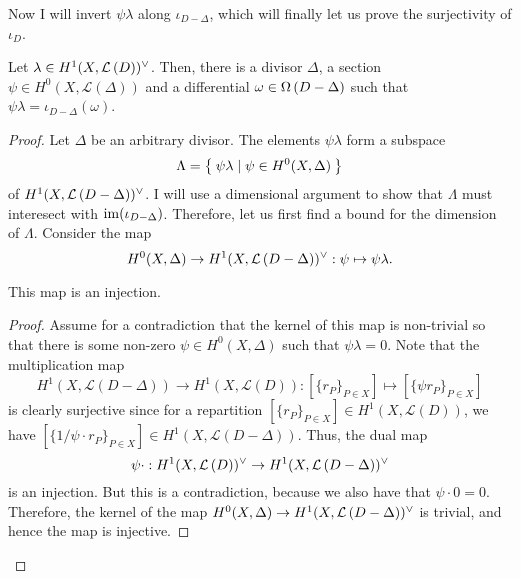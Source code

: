 Now I will invert $\psi\lambda$ along $\iota_{D-\Delta}$, which will finally
let us prove the surjectivity of $\iota_{D}$.
\begin{lemm}\label{lemm:invert_iota}
  Let $\lambda\in H^1(X,\mathcal{L}\left(D\right))^{\vee}$. Then, there is a divisor $\Delta$,
  a section $\psi\in H^{0}(X,\mathcal{L}(\Delta))$ and a differential
  $\omega\in\Omega\left(D-\Delta\right)$ such that $\psi\lambda
  =\iota_{D-\Delta}(\omega)$.
\end{lemm}
\begin{proof}
  Let $\Delta$ be an arbitrary divisor. The elements $\psi\lambda$ form a
  subspace
  \[
    \Lambda=\Set{\psi\lambda\mid\psi\in H^{0}(X,\Delta)}
  \]
  of $H^1(X,\mathcal{L}\left(D-\Delta\right))^{\vee}$. I will use a dimensional argument to show that
  $\Lambda$ must interesect with $\operatorname{im}(\iota_{D-\Delta})$. Therefore,
  let us first find a bound for the dimension of $\Lambda$. Consider the map
  \[H^{0}(X,\Delta)\to H^1(X,\mathcal{L}\left(D-\Delta\right))^{\vee}:\psi\mapsto\psi\lambda.\]
  \begin{claim}
    This map is an injection.
  \end{claim}
  {\renewcommand{\qedsymbol}{$\blacksquare$}
    \begin{proof}
      Assume for a contradiction that the kernel of this map is non-trivial
      so that there is some non-zero $\psi\in H^{0}(X,\Delta)$ such that
      $\psi\lambda=0$. Note that the multiplication map
      \[
        H^{1}(X,\mathcal{L}(D-\Delta))\to H^{1}(X,\mathcal{L}(D))
        :[\{r_{P}\}_{P\in X}]\mapsto [\{\psi r_{P}\}_{P\in X}]
      \]
      is clearly surjective since for a repartition
      $[\{r_{P}\}_{P\in X}]\in H^{1}(X,\mathcal{L}(D))$, we have
      $[\{1/\psi\cdot r_{P}\}_{P\in X}]\in H^{1}(X,\mathcal{L}(D-\Delta))$.
      Thus, the dual map
      \[\psi\cdot:H^1(X,\mathcal{L}\left(D\right))^{\vee}\to H^1(X,\mathcal{L}\left(D-\Delta\right))^{\vee}\]
      is an injection. But this is a contradiction, because we also have that
      $\psi\cdot 0=0$. Therefore, the kernel of the map
      $H^{0}(X,\Delta)\to H^1(X,\mathcal{L}\left(D-\Delta\right))^{\vee}$ is trivial, and hence the map is
      injective.
    \end{proof}
  }


\end{proof}
